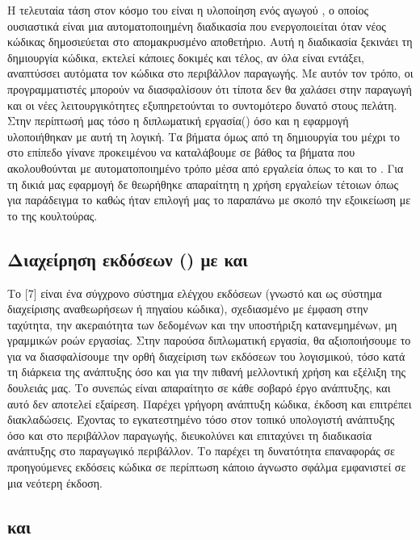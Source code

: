 Η τελευταία τάση στον κόσμο του  είναι η υλοποίηση ενός αγωγού , ο οποίος ουσιαστικά
είναι μια αυτοματοποιημένη διαδικασία που ενεργοποιείται όταν νέος κώδικας δημοσιεύεται στο
απομακρυσμένο αποθετήριο. Αυτή η διαδικασία ξεκινάει τη δημιουργία κώδικα, εκτελεί κάποιες δοκιμές και
τέλος, αν όλα είναι εντάξει, αναπτύσσει αυτόματα τον κώδικα στο
περιβάλλον παραγωγής. Με αυτόν τον τρόπο, οι προγραμματιστές μπορούν να διασφαλίσουν ότι τίποτα δεν θα χαλάσει
στην παραγωγή και οι νέες λειτουργικότητες εξυπηρετούνται το συντομότερο δυνατό στους
πελάτη. Στην περίπτωσή μας τόσο η διπλωματική εργασία() όσο και η εφαρμογή υλοποιήθηκαν με αυτή τη λογική. Τα βήματα όμως
από τη δημιουργία του  μέχρι το  στο  επίπεδο γίνανε  προκειμένου να καταλάβουμε σε βάθος 
τα βήματα που ακολουθούνται με αυτοματοποιημένο τρόπο μέσα από εργαλεία όπως το  και το . Για τη δικιά μας εφαρμογή δε θεωρήθηκε απαραίτητη η χρήση εργαλείων  τέτοιων όπως για παράδειγμα το  καθώς ήταν επιλογή μας
το παραπάνω με σκοπό την εξοικείωση με το  της  κουλτούρας.

\subsection{Διαχείρηση εκδόσεων () με  και  }

Το [7] είναι ένα σύγχρονο σύστημα ελέγχου εκδόσεων (γνωστό και ως σύστημα διαχείρισης αναθεωρήσεων ή πηγαίου κώδικα), 
σχεδιασμένο με έμφαση στην ταχύτητα, την ακεραιότητα των δεδομένων και την υποστήριξη κατανεμημένων, μη γραμμικών ροών εργασίας. 
Στην παρούσα διπλωματική εργασία, θα αξιοποιήσουμε το  για να διασφαλίσουμε την ορθή διαχείριση των εκδόσεων του λογισμικού, 
τόσο κατά τη διάρκεια της ανάπτυξης όσο και για την πιθανή μελλοντική χρήση και εξέλιξη της δουλειάς μας. Το  συνεπώς είναι απαραίτητο σε κάθε σοβαρό 
έργο ανάπτυξης, και αυτό δεν αποτελεί εξαίρεση. Παρέχει γρήγορη ανάπτυξη κώδικα, έκδοση και επιτρέπει διακλαδώσεις. Έχοντας το εγκατεστημένο τόσο στον τοπικό υπολογιστή ανάπτυξης όσο και στο περιβάλλον παραγωγής, διευκολύνει και επιταχύνει τη διαδικασία ανάπτυξης στο παραγωγικό περιβάλλον.
Το  παρέχει τη δυνατότητα επαναφοράς σε προηγούμενες εκδόσεις κώδικα σε
περίπτωση  κάποιο άγνωστο σφάλμα εμφανιστεί σε μια νεότερη έκδοση. 


\subsection{ και }

